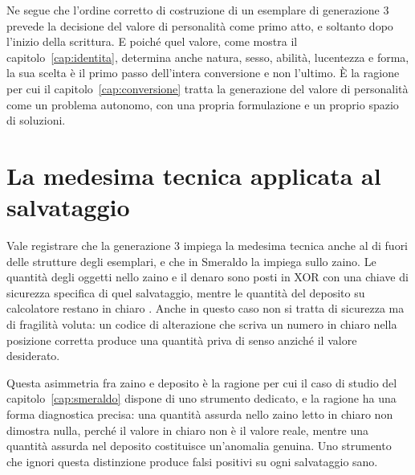 Ne segue che l'ordine corretto di costruzione di un esemplare di generazione 3 prevede la decisione del valore di personalità come primo atto, e soltanto dopo l'inizio della scrittura. E poiché quel valore, come mostra il capitolo~\ref{cap:identita}, determina anche natura, sesso, abilità, lucentezza e forma, la sua scelta è il primo passo dell'intera conversione e non l'ultimo. È la ragione per cui il capitolo~\ref{cap:conversione} tratta la generazione del valore di personalità come un problema autonomo, con una propria formulazione e un proprio spazio di soluzioni.

\section{La medesima tecnica applicata al salvataggio}

Vale registrare che la generazione 3 impiega la medesima tecnica anche al di fuori delle strutture degli esemplari, e che in Smeraldo la impiega sullo zaino. Le quantità degli oggetti nello zaino e il denaro sono posti in XOR con una chiave di sicurezza specifica di quel salvataggio, mentre le quantità del deposito su calcolatore restano in chiaro \cite{pokeemerald}. Anche in questo caso non si tratta di sicurezza ma di fragilità voluta: un codice di alterazione che scriva un numero in chiaro nella posizione corretta produce una quantità priva di senso anziché il valore desiderato.

Questa asimmetria fra zaino e deposito è la ragione per cui il caso di studio del capitolo~\ref{cap:smeraldo} dispone di uno strumento dedicato, e la ragione ha una forma diagnostica precisa: una quantità assurda nello zaino letto in chiaro non dimostra nulla, perché il valore in chiaro non è il valore reale, mentre una quantità assurda nel deposito costituisce un'anomalia genuina. Uno strumento che ignori questa distinzione produce falsi positivi su ogni salvataggio sano.
